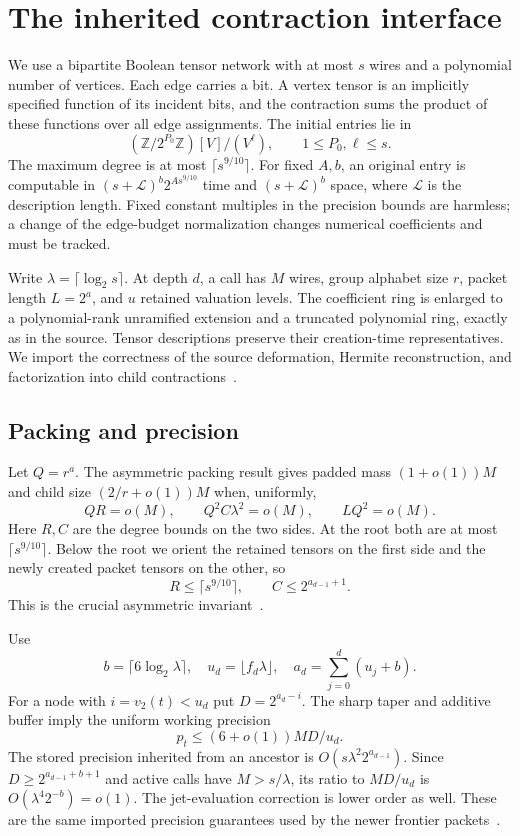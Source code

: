 \section{The inherited contraction interface}
\label{sec:interface}
We use a bipartite Boolean tensor network with at most $s$ wires and a
polynomial number of vertices. Each edge carries a bit. A vertex tensor
is an implicitly specified function of its incident bits, and the
contraction sums the product of these functions over all edge assignments.
The initial entries lie in
\[
 (\mathbb Z/2^{P_0}\mathbb Z)[V]/(V^\ell),\qquad 1\le P_0,\ell\le s.
\]
The maximum degree is at most $\lceil s^{9/10}\rceil$. For fixed $A,b$,
an original entry is computable in
$(s+\mathcal L)^b2^{A s^{9/10}}$ time and $(s+\mathcal L)^b$ space,
where $\mathcal L$ is the description length. Fixed constant multiples
in the precision bounds are harmless; a change of the edge-budget
normalization changes numerical coefficients and must be tracked.

Write $\lambda=\lceil\log_2s\rceil$. At depth $d$, a call has $M$ wires,
group alphabet size $r$, packet length $L=2^a$, and $u$ retained
valuation levels. The coefficient ring is enlarged to a polynomial-rank
unramified extension and a truncated polynomial ring, exactly as in the
source. Tensor descriptions preserve their creation-time representatives.
We import the correctness of the source deformation, Hermite reconstruction,
and factorization into child contractions~\cite{upstream}.

\subsection{Packing and precision}
Let $Q=r^a$. The asymmetric packing result gives padded mass
$(1+o(1))M$ and child size $(2/r+o(1))M$ when, uniformly,
\begin{equation}\label{eq:packing-import}
 QR=o(M),\qquad Q^2 C\lambda^2=o(M),\qquad LQ^2=o(M).
\end{equation}
Here $R,C$ are the degree bounds on the two sides. At the root both
are at most $\lceil s^{9/10}\rceil$. Below the root we orient the
retained tensors on the first side and the newly created packet
tensors on the other, so
\[
 R\le\lceil s^{9/10}\rceil,\qquad C\le2^{a_{d-1}+1}.
\]
This is the crucial asymmetric invariant~\cite{asymmetric}.

Use
\[
 b=\lceil6\log_2\lambda\rceil,\quad
 u_d=\lfloor f_d\lambda\rfloor,\quad
 a_d=\sum_{j=0}^d(u_j+b).
\]
For a node with $i=v_2(t)<u_d$ put $D=2^{a_d-i}$.
The sharp taper and additive buffer imply the uniform working precision
\begin{equation}\label{eq:precision-import}
 p_t\le(6+o(1))MD/u_d.
\end{equation}
The stored precision inherited from an ancestor is
$O(s\lambda^2 2^{a_{d-1}})$. Since
$D\ge2^{a_{d-1}+b+1}$ and active calls have
$M>s/\lambda$, its ratio to $MD/u_d$ is
$O(\lambda^4 2^{-b})=o(1)$.
The jet-evaluation correction is lower order as well.
These are the same imported precision guarantees used by the newer
frontier packets~\cite{precision,frontier,tree}.

